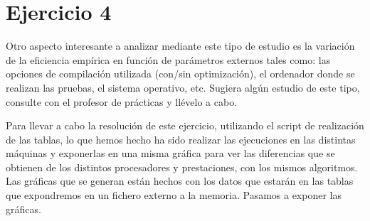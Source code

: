\documentclass[a4paper, 11pt]{article}
\begin{document}
\section{Ejercicio 4}
Otro aspecto interesante a analizar mediante este tipo de estudio es la variación de la eficiencia empírica en función de parámetros externos tales como: las opciones de compilación utilizada (con/sin optimización), el ordenador donde se realizan las pruebas, el sistema operativo, etc. Sugiera algún estudio de este tipo, consulte con el profesor de prácticas y llévelo a cabo.

Para llevar a cabo la resolución de este ejercicio, utilizando el script de realización de las tablas, lo que hemos hecho ha sido realizar las ejecuciones en las distintas máquinas y exponerlas en una misma gráfica para ver las diferencias que se obtienen de los distintos procesadores y prestaciones, con los mismos algoritmos. Las gráficas que se generan están hechos con los datos que estarán en las tablas que expondremos en un fichero externo a la memoria. Pasamos a exponer las gráficas.
\end{document}
